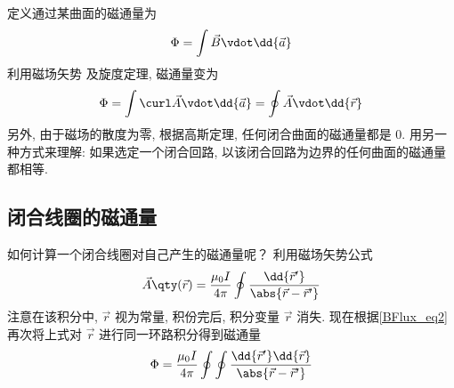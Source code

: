 
定义通过某曲面的磁通量为
\begin{equation}
\Phi  = \int \vec B \vdot \dd{\vec a}
\end{equation}
利用磁场矢势%
及旋度定理, %
磁通量变为
\begin{equation} \label{BFlux_eq2}
\Phi  = \int \curl \vec A \vdot \dd{\vec a}  = \oint \vec A \vdot \dd{\vec r}
\end{equation}
另外, 由于磁场的散度为零, 根据高斯定理, 任何闭合曲面的磁通量都是 0.
用另一种方式来理解: 如果选定一个闭合回路, 以该闭合回路为边界的任何曲面的磁通量都相等.

\subsection{闭合线圈的磁通量}

如何计算一个闭合线圈对自己产生的磁通量呢？ 利用磁场矢势公式
\begin{equation}
\vec A \qty(\vec r) = \frac{\mu_0 I}{4 \pi} \oint \frac{\dd{\vec r'}}{\abs{\vec r - \vec r'}}
\end{equation}
注意在该积分中, $\vec r$ 视为常量, 积份完后, 积分变量 $\vec r$ 消失. 现在根据\autoref{BFlux_eq2} 再次将上式对 $\vec r$ 进行同一环路积分得到磁通量
\begin{equation}
\Phi  = \frac{\mu_0 I}{4\pi} \oint\oint \frac{\dd{\vec r'} \dd{\vec r}}{\abs{\vec r - \vec r'}}
\end{equation}
